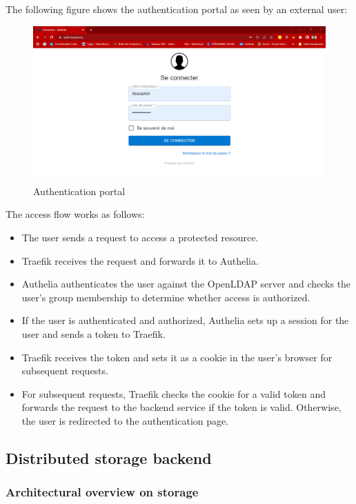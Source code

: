 The following figure shows the authentication portal as seen by an external user: 
\begin{figure}[H]\centering
\includegraphics[width=1.0\textwidth,angle=00]{assets/f55.png}
\caption{Authentication portal}
\label{fig:f55}
\end{figure}

The access flow works as follows: 
\begin{itemize}[label={--}]
\item The user sends a request to access a protected resource. 
\item  Traefik receives the request and forwards it to Authelia. 
\item  Authelia authenticates the user against the OpenLDAP server and checks the user's group membership to determine whether access is authorized. 
\item  If the user is authenticated and authorized, Authelia sets up a session for the user and sends a token to Traefik. 
\item  Traefik receives the token and sets it as a cookie in the user's browser for subsequent requests. 
\item  For subsequent requests, Traefik checks the cookie for a valid token and forwards the request to the backend service if the token is valid. Otherwise, the user is redirected to the authentication page.  
\end{itemize}

\newpage

\subsection{Distributed storage backend}

\subsubsection{Architectural overview on storage}

